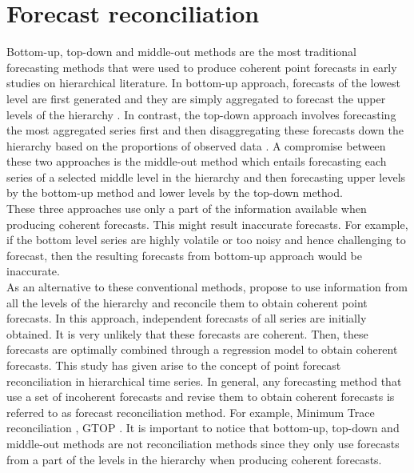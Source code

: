 \documentclass[a4paper, 11pt]{article}
\begin{document}
\section{Forecast reconciliation}
\noindent
Bottom-up, top-down and middle-out methods are the most traditional forecasting methods that were used to produce coherent point forecasts in early studies on hierarchical literature. In bottom-up approach, forecasts of the lowest level are first generated and they are simply aggregated to forecast the upper levels of the hierarchy \citep{Dunn1976}. 
In contrast, the top-down approach involves forecasting the most aggregated series first and then disaggregating these forecasts down the hierarchy based on the proportions of observed data \citep{Gross1990}. A compromise between these two approaches is the middle-out method which entails forecasting each series of a selected middle level in the hierarchy and then forecasting upper levels by the bottom-up method and lower levels by the top-down method.\\ 

\noindent
These three approaches use only a part of the information available when producing coherent forecasts. This might result inaccurate forecasts. For example, if the bottom level series are highly volatile or too noisy and hence challenging to forecast, then the resulting forecasts from bottom-up approach would be inaccurate.\\

\noindent
As an alternative to these conventional methods, \citet{Hyndman2011} propose to use information from all the levels of the hierarchy and reconcile them to obtain coherent point forecasts. In this approach, independent forecasts of all series are initially obtained. It is very unlikely that these forecasts are coherent. Then, these forecasts are optimally combined through a regression model to obtain coherent forecasts. This study has given arise to the concept of point forecast reconciliation in hierarchical time series. In general, any forecasting method that use a set of incoherent forecasts and revise them to obtain coherent forecasts is referred to as forecast reconciliation method. For example, Minimum Trace reconciliation \citep{Wickramasuriya2017}, GTOP \citep{VanErven2015a}. It is important to notice that bottom-up, top-down and middle-out methods are not reconciliation methods since they only use forecasts from a part of the levels in the hierarchy when producing coherent forecasts. \\
\end{document}
